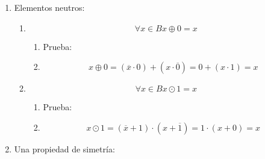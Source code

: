 \begin{enumerate}
\begin{enumerate}
\begin{enumerate}
      \begin{enumerate}
      \def\labelenumiv{\arabic{enumiv}.}
      \item
        \[\forall{x \in B}x \oplus {1 = \bar{x}}\]

        \begin{enumerate}
        \def\labelenumv{\arabic{enumv}.}
        \tightlist
        \item
          Prueba:
        \item
          \[x \oplus {{{{1 = {{({\overline{x} \cdot 1})} + {({x \cdot \overline{1}})}}} = {\overline{x} + {({x \cdot 0})}}} = {\overline{x} + 0}} = \overline{x}}\]
        \end{enumerate}
      \item
        \[\forall{x \in B}x \odot {0 = \bar{x}}\]

        \begin{enumerate}
        \def\labelenumv{\arabic{enumv}.}
        \tightlist
        \item
          Prueba:
        \item
          \[x \odot {{{{0 = {{({\overline{x} + 0})} \cdot {({x + \overline{0}})}}} = {\overline{x} \cdot {({x + 1})}}} = {\overline{x} + 1}} = \overline{x}}\]
        \end{enumerate}
      \end{enumerate}
    \item
      Elementos neutros:

      \begin{enumerate}
      \def\labelenumiv{\arabic{enumiv}.}
      \item
        \[\forall{x \in B}x \oplus {0 = x}\]

        \begin{enumerate}
        \def\labelenumv{\arabic{enumv}.}
        \tightlist
        \item
          Prueba:
        \item
          \[x \oplus {{{0 = {{({\overline{x} \cdot 0})} + {({x \cdot \overline{0}})}}} = {0 + {({x \cdot 1})}}} = x}\]
        \end{enumerate}
      \item
        \[\forall{x \in B}x \odot {1 = x}\]

        \begin{enumerate}
        \def\labelenumv{\arabic{enumv}.}
        \tightlist
        \item
          Prueba:
        \item
          \[x \odot {{{1 = {{({\overline{x} + 1})} \cdot {({x + \overline{1}})}}} = {1 \cdot {({x + 0})}}} = x}\]
        \end{enumerate}
      \end{enumerate}
    \item
      Una propiedad de simetría:


\end{enumerate}
\end{enumerate}
\end{enumerate}
